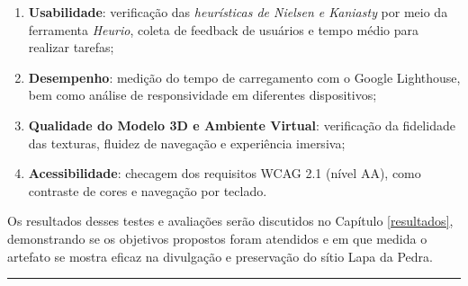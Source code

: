 \begin{enumerate}
    \item \textbf{Usabilidade}: verificação das \textit{heurísticas de Nielsen e Kaniasty} por meio da ferramenta \textit{Heurio}, coleta de feedback de usuários e tempo médio para realizar tarefas;
    \item \textbf{Desempenho}: medição do tempo de carregamento com o Google Lighthouse, bem como análise de responsividade em diferentes dispositivos;
    \item \textbf{Qualidade do Modelo 3D e Ambiente Virtual}: verificação da fidelidade das texturas, fluidez de navegação e experiência imersiva;
    \item \textbf{Acessibilidade}: checagem dos requisitos WCAG 2.1 (nível AA), como contraste de cores e navegação por teclado.
\end{enumerate}

Os resultados desses testes e avaliações serão discutidos no Capítulo \ref{resultados}, demonstrando se os objetivos propostos foram atendidos e em que medida o artefato se mostra eficaz na divulgação e preservação do sítio Lapa da Pedra.

\noindent\rule{12cm}{0.4pt}
